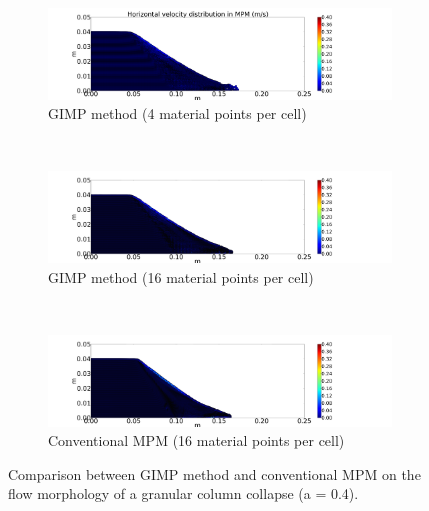 \begin{figure}
\ContinuedFloat
	\centering
	\begin{subfigure}[b]{\textwidth}
		\centering
		\includegraphics[width=\textwidth]{4GIMPM_6tc}
		\caption{GIMP method (4 material points per cell)}
		\label{fig:4GIMPM_6tc}
	\end{subfigure} \\
	\begin{subfigure}[b]{\textwidth}
		\centering
		\includegraphics[width=\textwidth]{16GIMPM_6tc}
		\caption{GIMP method (16 material points per cell)}
		\label{fig:16GIMPM_6tc}
	\end{subfigure} \\
	\begin{subfigure}[b]{\textwidth}
		\centering
		\includegraphics[width=\textwidth]{16MPM_6tc}
		\caption{Conventional MPM (16 material points per cell)}
		\label{fig:16MPM_6tc}
	\end{subfigure}
	\caption*{$t = 6\tau_c$}
	\caption{Comparison between GIMP method and conventional MPM on the flow 
	morphology of a granular column collapse (a = 0.4).}
	\label{fig:MPM_GIMP_TC}
\end{figure} 


